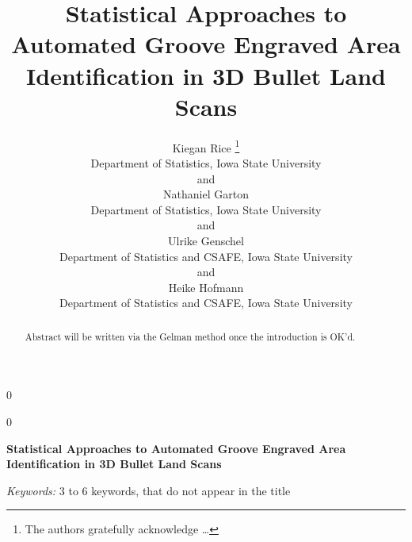 \documentclass[12pt]{article}
\newcommand{\blind}{0}
\begin{document}
\def\spacingset#1{\renewcommand{\baselinestretch}%
{#1}\small\normalsize} \spacingset{1}




\blind
{
  \title{\bf Statistical Approaches to Automated Groove Engraved Area Identification
in 3D Bullet Land Scans}

  \author{
        Kiegan Rice \thanks{The authors gratefully acknowledge \ldots{}} \\
    Department of Statistics, Iowa State University\\
     and \\     Nathaniel Garton \\
    Department of Statistics, Iowa State University\\
     and \\     Ulrike Genschel \\
    Department of Statistics and CSAFE, Iowa State University\\
     and \\     Heike Hofmann \\
    Department of Statistics and CSAFE, Iowa State University\\
      }
  \maketitle
} \fi

\blind
{
  \bigskip
  \bigskip
  \bigskip
  \begin{center}
    {\LARGE\bf Statistical Approaches to Automated Groove Engraved Area Identification
in 3D Bullet Land Scans}
  \end{center}
  \medskip
} \fi

\bigskip
\begin{abstract}
Abstract will be written via the Gelman method once the introduction is
OK'd.
\end{abstract}

\noindent%
{\it Keywords:} 3 to 6 keywords, that do not appear in the title
\vfill

\newpage
\spacingset{1.45} %

\newcommand{\hh}[1]{{\color{orange}{#1}}}
\newcommand{\kr}[1]{{\color{teal}{#1}}}
\newcommand{\ug}[1]{{\color{purple}{#1}}}
\newcommand{\nate}[1]{{\color{olive}{#1}}}
\end{document}
